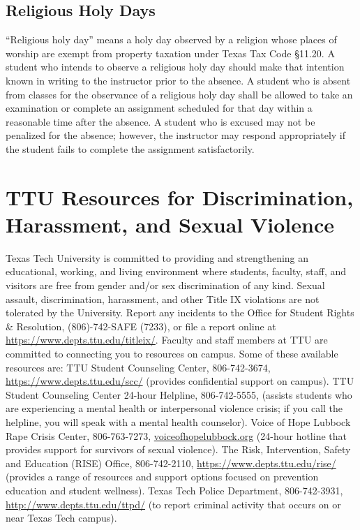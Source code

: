 \documentclass[12pt, notitlepage]{article}   	%
\begin{document}
{\subsection{Religious Holy Days}
“Religious holy day” means a holy day observed by a religion whose places of worship 
are exempt from property taxation under Texas Tax Code §11.20. 
A student who intends to observe a religious holy day should make that intention known 
in writing to the instructor prior to the absence. 
A student who is absent from classes for the observance of a religious holy day shall be 
allowed to take an examination or complete an assignment scheduled for that day within a 
reasonable time after the absence. 
A student who is excused may not be penalized for the absence; however, the instructor 
may respond appropriately if the student fails to complete the assignment satisfactorily.

\section{TTU Resources for Discrimination, Harassment, and Sexual Violence}
Texas Tech University is committed to providing and strengthening an educational, 
working, and living environment where students, faculty, staff, and visitors are 
free from gender and/or sex discrimination of any kind. 
Sexual assault, discrimination, harassment, and other Title IX violations are 
not tolerated by the University. 
Report any incidents to the Office for Student Rights & Resolution, 
(806)-742-SAFE (7233), or file a report online at \url{https://www.depts.ttu.edu/titleix/}. 
Faculty and staff members at TTU are committed to connecting you to resources on campus. 
Some of these available resources are: TTU Student Counseling Center, 806-742-3674, 
\url{https://www.depts.ttu.edu/scc/} (provides confidential support on campus). 
TTU Student Counseling Center 24-hour Helpline, 806-742-5555, 
(assists students who are experiencing a mental health or interpersonal violence crisis; 
if you call the helpline, you will speak with a mental health counselor). 
Voice of Hope Lubbock Rape Crisis Center, 806-763-7273, \url{voiceofhopelubbock.org} 
(24-hour hotline that provides support for survivors of sexual violence). 
The Risk, Intervention, Safety and Education (RISE) Office, 806-742-2110, 
\url{https://www.depts.ttu.edu/rise/} (provides a range of resources and 
support options focused on prevention education and student wellness). 
Texas Tech Police Department, 806-742-3931, \url{http://www.depts.ttu.edu/ttpd/} 
(to report criminal activity that occurs on or near Texas Tech campus). 

}
\end{document}
